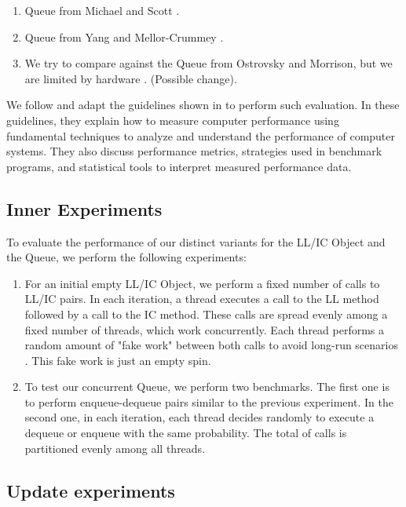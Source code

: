 \begin{enumerate}
\item Queue from Michael and Scott \cite{DBLP_conf_podc_MichaelS96}.
\item Queue from Yang and Mellor-Crummey \cite{DBLP_conf_ppopp_YangM16}.
\item We try to compare against the Queue from Ostrovsky and Morrison, but we
are limited by hardware \cite{scalingconcurrent2020}. (Possible change).
\end{enumerate}

We follow and adapt the guidelines shown in
\cite{lilja2005measuring, DBLP_conf_oopsla_GeorgesBE07, forsyth2018probability} to perform such evaluation. In
these guidelines, they explain how to measure computer performance using
fundamental techniques to analyze and understand the performance of computer
systems. They also discuss performance metrics, strategies used in
benchmark programs, and statistical tools to interpret measured performance
data.

\subsection{Inner Experiments}
\label{sec:org4649774}

To evaluate the performance of our distinct variants for the LL/IC Object
and the Queue, we perform the following experiments:

\begin{enumerate}
\item For an initial empty LL/IC Object, we perform a fixed number of calls to
LL/IC pairs. In each iteration, a thread executes a call to the LL method
followed by a call to the IC method. These calls are spread evenly among
a fixed number of threads, which work concurrently. Each thread performs
a random amount of "fake work" between both calls to avoid long-run
scenarios
\cite{DBLP_conf_ppopp_YangM16,DBLP_conf_podc_MichaelS96}. This fake
work is just an empty spin.
\item To test our concurrent Queue, we perform two benchmarks. The first one is
to perform enqueue-dequeue pairs similar to the previous experiment. In
the second one, in each iteration, each thread decides randomly to
execute a dequeue or enqueue with the same probability. The total of
calls is partitioned evenly among all threads.
\end{enumerate}


\subsection{Update experiments}
\label{sec:org5027fac}

